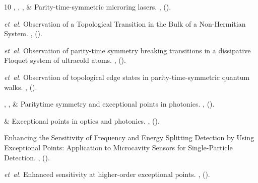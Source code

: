 \documentclass[prl,twocolumn,english,superscriptaddress,floatfix,longbibliography]{revtex4-2}
\begin{document}
\begin{thebibliography}{10}
, ,
  ,  \&
\newblock Parity-time-symmetric microring lasers.
\newblock \emph{} \textbf{},
   ().

 \emph{et~al.}
\newblock Observation of a Topological Transition in the Bulk of a
  Non-Hermitian System.
\newblock \emph{}
  \textbf{}, 
  ().

 \emph{et~al.}
\newblock Observation of parity-time symmetry breaking transitions in a
  dissipative Floquet system of ultracold atoms.
\newblock \emph{}
  \textbf{},  ().

 \emph{et~al.}
\newblock Observation of topological edge states in parity-time-symmetric
  quantum walks.
\newblock \emph{}
  \textbf{}, 
  ().

, ,
   \& 
\newblock Parity{\textendash}time symmetry and exceptional points in photonics.
\newblock \emph{}
  \textbf{}, 
  ().

 \& 
\newblock Exceptional points in optics and photonics.
\newblock \emph{} \textbf{},
   ().

\newblock Enhancing the Sensitivity of Frequency and Energy Splitting Detection
  by Using Exceptional Points: Application to Microcavity Sensors for
  Single-Particle Detection.
\newblock \emph{}
  \textbf{}, 
  ().

 \emph{et~al.}
\newblock Enhanced sensitivity at higher-order exceptional points.
\newblock \emph{} \textbf{},
   ().


\end{thebibliography}
\end{document}
